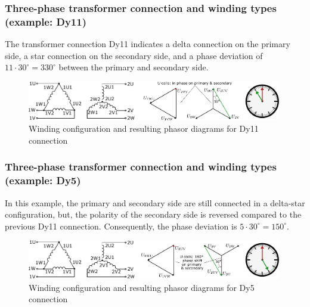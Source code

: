 \begin{frame}
	\frametitle{Three-phase transformer connection and winding types (example: Dy11)}
	The transformer connection Dy11 indicates a delta connection on the primary side, a star connection on the secondary side, and a phase deviation of $11\cdot30^\circ=330^\circ$ between the primary and secondary side.	
	\vspace{2em}
	\begin{figure}
		\includegraphics[width=0.99\textwidth]{fig/lec04/Dy11_example.pdf}
		\caption{Winding configuration and resulting phasor diagrams for Dy11 connection}
		\label{fig:Dy11_example}
	\end{figure}
\end{frame}

\begin{frame}
	\frametitle{Three-phase transformer connection and winding types (example: Dy5)}
	In this example, the primary and secondary side are still connected in a delta-star configuration, but, the polarity of the secondary side is reversed compared to the previous Dy11 connection. Consequently, the phase deviation is $5\cdot30^\circ=150^\circ$.
	\vspace{2em}
	\begin{figure}
		\includegraphics[width=0.99\textwidth]{fig/lec04/Dy5_example.pdf}
		\caption{Winding configuration and resulting phasor diagrams for Dy5 connection}
		\label{fig:Dy5_example}
	\end{figure}
\end{frame}

